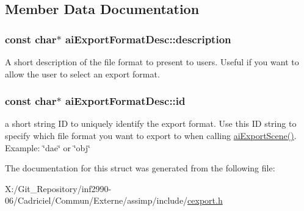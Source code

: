 \subsection{Member Data Documentation}
\hypertarget{structai_export_format_desc_a9c84c4b07c5177fb6539b9bdf90236fb}{
\subsubsection[{description}]{\setlength{\rightskip}{0pt plus 5cm}const char$\ast$ ai\-Export\-Format\-Desc\-::description}}\label{structai_export_format_desc_a9c84c4b07c5177fb6539b9bdf90236fb}
A short description of the file format to present to users. Useful if you want to allow the user to select an export format. \hypertarget{structai_export_format_desc_afe216eaea3a04abca041e5c253f94bbf}{
\subsubsection[{id}]{\setlength{\rightskip}{0pt plus 5cm}const char$\ast$ ai\-Export\-Format\-Desc\-::id}}\label{structai_export_format_desc_afe216eaea3a04abca041e5c253f94bbf}
a short string I\-D to uniquely identify the export format. Use this I\-D string to specify which file format you want to export to when calling \hyperlink{cexport_8h_a9615510b8430a9da4f435a72148128dd}{ai\-Export\-Scene()}. Example\-: \char`\"{}dae\char`\"{} or \char`\"{}obj\char`\"{} 

The documentation for this struct was generated from the following file\-:\begin{DoxyCompactItemize}
\item 
X\-:/\-Git\-\_\-\-Repository/inf2990-\/06/\-Cadriciel/\-Commun/\-Externe/assimp/include/\hyperlink{cexport_8h}{cexport.\-h}\end{DoxyCompactItemize}
